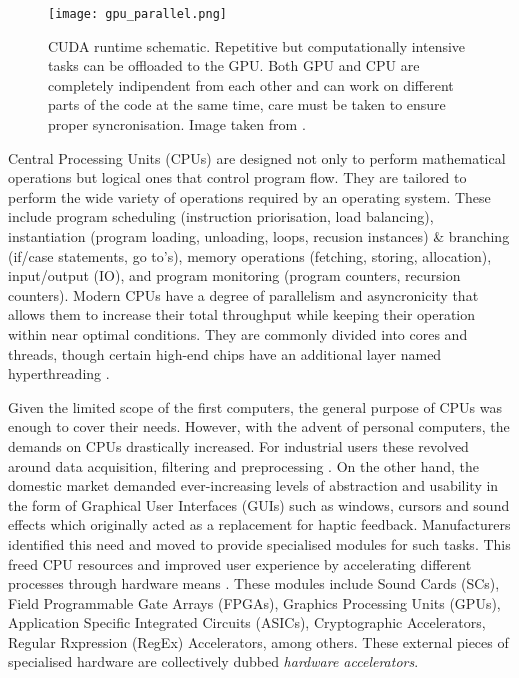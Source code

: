\begin{figure}
    \centering
    \texttt{[image: gpu\_parallel.png]}
    \caption[CUDA runtime schematic.]{CUDA runtime schematic. Repetitive but computationally intensive tasks can be offloaded to the GPU. Both GPU and CPU are completely indipendent from each other and can work on different parts of the code at the same time, care must be taken to ensure proper syncronisation. Image taken from \cite{nvidia}.}
    \label{f:cuda}
\end{figure}

Central Processing Units (CPUs) are designed not only to perform mathematical operations but logical ones that control program flow. They are tailored to perform the wide variety of operations required by an operating system. These include program scheduling (instruction priorisation, load balancing), instantiation (program loading, unloading, loops, recusion instances) \& branching (if/case statements, go to's), memory operations (fetching, storing, allocation), input/output (IO), and program monitoring (program counters, recursion counters). Modern CPUs have a degree of parallelism and asyncronicity that allows them to increase their total throughput while keeping their operation within near optimal conditions. They are commonly divided into cores and threads, though certain high-end chips have an additional layer named hyperthreading \cite{cpu_arch}.

Given the limited scope of the first computers, the general purpose of CPUs was enough to cover their needs. However, with the advent of personal computers, the demands on CPUs drastically increased. For industrial users these revolved around data acquisition, filtering and preprocessing \cite{fpga, preproc, filtering}. On the other hand, the domestic market demanded ever-increasing levels of abstraction and usability in the form of Graphical User Interfaces (GUIs) such as windows, cursors and sound effects which originally acted as a replacement for haptic feedback. Manufacturers identified this need and moved to provide specialised modules for such tasks. This freed CPU resources and improved user experience by accelerating different processes through hardware means \cite{gpu1, gpu2, gpu3, sound}. These modules include Sound Cards (SCs), Field Programmable Gate Arrays (FPGAs), Graphics Processing Units (GPUs), Application Specific Integrated Circuits (ASICs), Cryptographic Accelerators, Regular Rxpression (RegEx) Accelerators, among others. These external pieces of specialised hardware are collectively dubbed \emph{hardware accelerators}.

